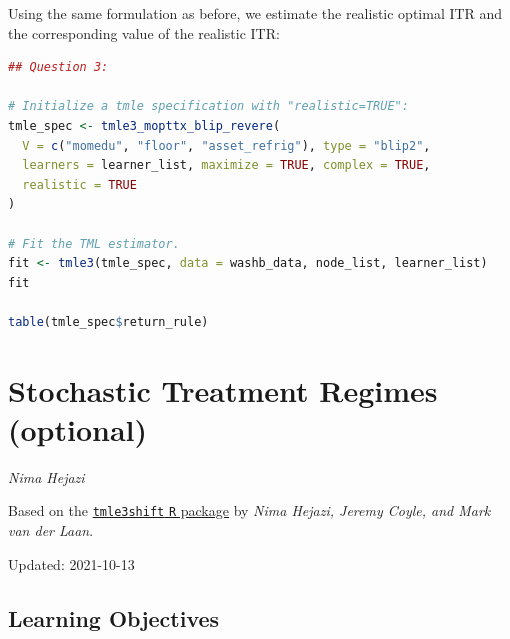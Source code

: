 \documentclass[
  12pt, krantz2,
]{book}
\newcommand{\passthrough}[1]{#1}
\theoremstyle{definition}
\theoremstyle{definition}
\theoremstyle{definition}
\newcommand{\1}{\mathbbm{1}}
\begin{document}
Using the same formulation as before, we estimate the realistic optimal ITR
and the corresponding value of the realistic ITR:

\begin{lstlisting}[language=R]
## Question 3:

# Initialize a tmle specification with "realistic=TRUE":
tmle_spec <- tmle3_mopttx_blip_revere(
  V = c("momedu", "floor", "asset_refrig"), type = "blip2",
  learners = learner_list, maximize = TRUE, complex = TRUE,
  realistic = TRUE
)

# Fit the TML estimator.
fit <- tmle3(tmle_spec, data = washb_data, node_list, learner_list)
fit

table(tmle_spec$return_rule)
\end{lstlisting}

\hypertarget{stochastic-treatment-regimes-optional}{%
\chapter{Stochastic Treatment Regimes (optional)}\label{stochastic-treatment-regimes-optional}}

\emph{Nima Hejazi}

Based on the \href{https://github.com/tlverse/tmle3shift}{\passthrough{\lstinline!tmle3shift!} \passthrough{\lstinline!R!} package}
by \emph{Nima Hejazi, Jeremy Coyle, and Mark van der Laan}.

Updated: 2021-10-13

\hypertarget{learning-objectives-4}{%
\section{Learning Objectives}\label{learning-objectives-4}}
\end{document}
